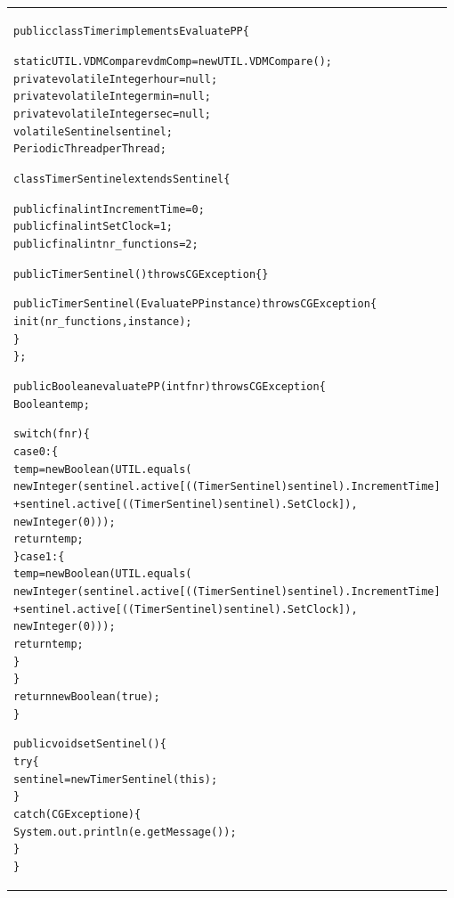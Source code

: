 \documentclass[\pformat,11pt]{article}
\newlength{\negoneline}
\newcommand{\listingsize}[0]{\renewcommand{\baselinestretch}{0.95}\tt\footnotesize}
\newcommand{\startbox}[0]{
\begin{center}
\listingsize  
\begin{tabular}{|p{.975\textwidth}|}\hline\vspace{\negoneline}}
\newcommand{\interruptbox}[0]{
\end{tabular}
\end{center}}
\newcommand{\scriptlistingsize}[0]{\tt\scriptsize}
\newcommand{\gbx}[1]{\colorbox{bggray}{#1}}
\begin{document}
\startbox
{\scriptlistingsize\begin{alltt} 
public class Timer \gbx{implements EvaluatePP} \{

  static UTIL.VDMCompare vdmComp = new UTIL.VDMCompare();
  private \gbx{volatile} Integer hour = null;
  private \gbx{volatile} Integer min = null;
  private \gbx{volatile} Integer sec = null;
  \gbx{volatile Sentinel sentinel};
  \gbx{PeriodicThread perThread};

  \gbx{class TimerSentinel extends Sentinel \{}

    public final int IncrementTime = 0;
    public final int SetClock = 1;
    public final int nr_functions = 2;

    public TimerSentinel () throws CGException\{\}

    public TimerSentinel (EvaluatePP instance) throws CGException\{
      init(nr_functions, instance);
    \}
  \};

  \gbx{public Boolean evaluatePP (int fnr) throws CGException\{}
    Boolean temp;    

    switch(fnr) \{    
    case 0: \{
      temp = new Boolean(UTIL.equals(
               new Integer(sentinel.active[((TimerSentinel) sentinel).IncrementTime] 
                           + sentinel.active[((TimerSentinel) sentinel).SetClock]), 
               new Integer(0)));
      return temp;
    \}    case 1: \{
      temp = new Boolean(UTIL.equals(
               new Integer(sentinel.active[((TimerSentinel) sentinel).IncrementTime] 
                           + sentinel.active[((TimerSentinel) sentinel).SetClock]), 
               new Integer(0)));
      return temp;
    \}
    \}
    return new Boolean(true);
  \}

  \gbx{public void setSentinel () \{}
    try\{
      sentinel = new TimerSentinel(this);
    \}
    catch (CGException e) \{
      System.out.println(e.getMessage());
    \}
  \}


\end{alltt}}
\interruptbox 
\end{document}
